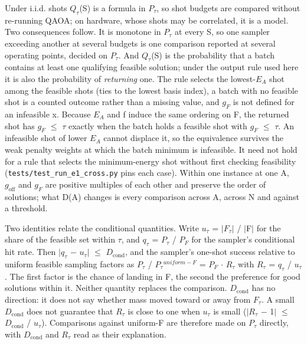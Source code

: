 \documentclass{ieeeaccess}
\begin{document}
Under i.i.d. shots $Q_{\tau}$(S) is a formula in $P_{\tau}$, so shot budgets are compared without re-running QAOA; on hardware, whose shots may be correlated, it is a model. Two consequences follow. It is monotone in $P_{\tau}$ at every S, so one sampler exceeding another at several budgets is one comparison reported at several operating points, decided on $P_{\tau}$. And $Q_{\tau}$(S) is the probability that a batch contains at least one qualifying feasible solution; under the output rule used here it is also the probability of \textit{returning} one. The rule selects the lowest-$E_{A}$ shot among the feasible shots (ties to the lowest basis index), a batch with no feasible shot is a counted outcome rather than a missing value, and $g_{F}$ is not defined for an infeasible x. Because $E_{A}$ and f induce the same ordering on F, the returned shot has $g_{F}$ $\leq$ $\tau$ exactly when the batch holds a feasible shot with $g_{F}$ $\leq$ $\tau$. An infeasible shot of lower $E_{A}$ cannot displace it, so the equivalence survives the weak penalty weights at which the batch minimum is infeasible. It need not hold for a rule that selects the minimum-energy shot without first checking feasibility (\texttt{tests/test\_run\_e1\_cross.py} pins each case). Within one instance at one A, $g_{\mathrm{off}}$ and $g_{F}$ are positive multiples of each other and preserve the order of solutions; what D(A) changes is every comparison across A, across N and against a threshold.


Two identities relate the conditional quantities. Write $u_{\tau}$ = $|$$F_{\tau}$$|$ / $|$F$|$ for the share of the feasible set within $\tau$, and $q_{\tau}$ = $P_{\tau}$ / $P_{F}$ for the sampler's conditional hit rate. Then $|$$q_{\tau}$ $-$ $u_{\tau}$$|$ $\leq$ $D_{\mathrm{cond}}$, and the sampler's one-shot success relative to uniform feasible sampling factors as $P_{\tau}$ / $P_{\tau}$$^{uniform-F}$ = $P_{F}$ $\cdot$ $R_{\tau}$ with $R_{\tau}$ = $q_{\tau}$ / $u_{\tau}$. The first factor is the chance of landing in F, the second the preference for good solutions within it. Neither quantity replaces the comparison. $D_{\mathrm{cond}}$ has no direction: it does not say whether mass moved toward or away from $F_{\tau}$. A small $D_{\mathrm{cond}}$ does not guarantee that $R_{\tau}$ is close to one when $u_{\tau}$ is small ($|$$R_{\tau}$ $-$ 1$|$ $\leq$ $D_{\mathrm{cond}}$ / $u_{\tau}$). Comparisons against uniform-F are therefore made on $P_{\tau}$ directly, with $D_{\mathrm{cond}}$ and $R_{\tau}$ read as their explanation.
\end{document}
